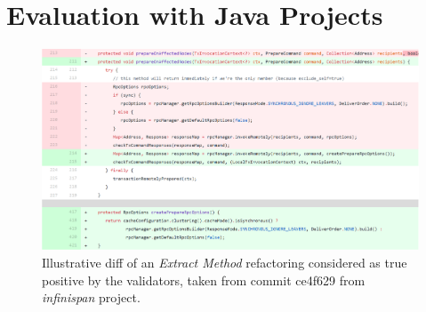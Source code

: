 \section{Evaluation with Java Projects}
\label{sec:eval:java}

\begin{figure}[htpb]
\centering
\includegraphics[width=1.0\textwidth]{img/ex-new-extract-infinispan-ce4f629.png}
\caption{Illustrative diff of an \emph{Extract Method} refactoring considered as true positive by the validators, taken from commit ce4f629 from \emph{infinispan} project.}
\label{FigDiff3}
\end{figure}


